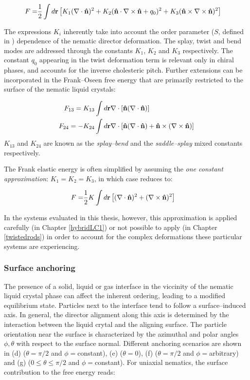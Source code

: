 \begin{align}
F = & \frac{1}{2} \int d {\bf r} \left [ K_{1} (\nabla \cdot {\bf \hat{n}})^{2}  + K_{2} ({\bf \hat{n}} \cdot \nabla \times {\bf \hat{n}} + q_{0})^{2}  +   K_{3} ({\bf \hat{n}} \times \nabla \times {\bf \hat{n}})^{2} \right ]
    \label{frankoseen}
\end{align}

The expressions $K_i$ inherently take into account the order parameter ($S$, defined in ) dependence of the nematic director deformation. The splay, twist and bend modes are addressed through the constants $K_1$, $K_2$ and $K_3$ respectively. The constant $q_0$ appearing in the twist deformation term is relevant only in chiral phases, and accounts for the inverse cholesteric pitch. Further extensions can be incorporated in the Frank--Oseen free energy that are primarily restricted to the surface of the nematic liquid crystals:


\begin{align}
F_{13} = K_{13} & \int d {\bf r}  \nabla \cdot \left[{\bf \hat{n}}(\nabla \cdot {\bf \hat{n}})\right] \\
F_{24} = -K_{24} & \int d {\bf r} \nabla \cdot \left[{\bf \hat{n}}(\nabla \cdot {\bf \hat{n}}) + {\bf \hat{n}} \times (\nabla \times {\bf \hat{n}})\right]
\end{align}
$K_{13}$ and $K_{24}$ are known as the {\em splay--bend} and the {\em saddle--splay} mixed constants respectively.

The Frank elastic energy is often simplified by assuming the {\em one constant approximation}: $K_1=K_2=K_3$, in which case  reduces to:

\begin{align}
F = & \frac{1}{2} K \int d {\bf r} \left [ (\nabla \cdot {\bf \hat{n}})^{2}  + (\nabla \times {\bf \hat{n}})^{2} \right ]
\end{align}

In the systems evaluated in this thesis, however, this approximation is applied carefully (in Chapter \ref{hybridLC1}) or not possible to apply (in Chapter \ref{twistedrods}) in order to account for the complex deformations these particular systems are experiencing.

\subsubsection{Surface anchoring}

The presence of a solid, liquid or gas interface in the viccinity of the nematic liquid crystal phase can affect the inherent ordering, leading to a modified equilibrium state. Particles next to the interface tend to follow a surface--induced axis. In general, the director alignment along this axis is determined by the interaction between the liquid crytal and the aligning surface. The particle orientation near the surface is characterized by the azimuthal and polar angles $\phi, \theta$ with respect to the surface normal. Different anchoring scenarios are shown in  (d) ($\theta=\pi/2$ and $\phi=$constant), (e) ($\theta=0$), (f) ($\theta=\pi/2$ and $\phi=$arbitrary) and (g) ($0\leq\theta\leq\pi/2$ and $\phi=$constant). For uniaxial nematics, the surface contribution to the free energy reads:

